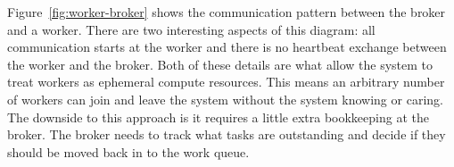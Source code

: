 \documentclass[conference]{IEEEtran}
\begin{document}
Figure~\ref{fig:worker-broker} shows the communication pattern between the
broker and a worker. There are two interesting aspects of this diagram: all
communication starts at the worker and there is no heartbeat exchange between
the worker and the broker. Both of these details are what allow the system to
treat workers as ephemeral compute resources. This means an arbitrary number of
workers can join and leave the system without the system knowing or caring. The
downside to this approach is it requires a little extra bookkeeping at the
broker. The broker needs to track what tasks are outstanding and decide if they
should be moved back in to the work queue.

% 
% 
\end{document}
